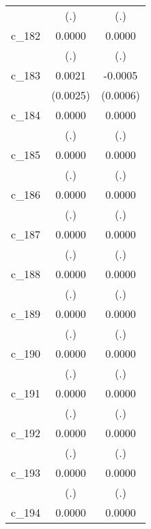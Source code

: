 {\begin{tabular}{l*{2}{c}}
            &         (.)        &         (.)        \\
[1em]
c\_182       &      0.0000        &      0.0000        \\
            &         (.)        &         (.)        \\
[1em]
c\_183       &      0.0021        &     -0.0005        \\
            &    (0.0025)        &    (0.0006)        \\
[1em]
c\_184       &      0.0000        &      0.0000        \\
            &         (.)        &         (.)        \\
[1em]
c\_185       &      0.0000        &      0.0000        \\
            &         (.)        &         (.)        \\
[1em]
c\_186       &      0.0000        &      0.0000        \\
            &         (.)        &         (.)        \\
[1em]
c\_187       &      0.0000        &      0.0000        \\
            &         (.)        &         (.)        \\
[1em]
c\_188       &      0.0000        &      0.0000        \\
            &         (.)        &         (.)        \\
[1em]
c\_189       &      0.0000        &      0.0000        \\
            &         (.)        &         (.)        \\
[1em]
c\_190       &      0.0000        &      0.0000        \\
            &         (.)        &         (.)        \\
[1em]
c\_191       &      0.0000        &      0.0000        \\
            &         (.)        &         (.)        \\
[1em]
c\_192       &      0.0000        &      0.0000        \\
            &         (.)        &         (.)        \\
[1em]
c\_193       &      0.0000        &      0.0000        \\
            &         (.)        &         (.)        \\
[1em]
c\_194       &      0.0000        &      0.0000        \\

\end{tabular}}
